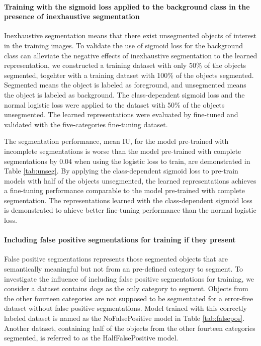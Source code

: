 \paragraph{Training with the sigmoid loss applied to the background class in the presence of inexhaustive segmentation}
Inexhaustive segmentation means that there exist unsegmented objects of interest in the training images.
To validate the use of sigmoid loss for the background class can alleviate the negative effects of inexhaustive segmentation to the learned representation, we constructed a training dataset with only 50\% of the objects segmented, togehter with a training dataset with 100\% of the objects segmented.
Segmented means the object is labeled as foreground, and unsegmented means the object is labeled as background.
The class-dependent sigmoid loss and the normal logistic loss were applied to the dataset with 50\% of the objects unsegmented.
The learned representations were evaluated by fine-tuned and validated with the five-categories fine-tuning dataset.

The segmentation performance, mean IU, for the model pre-trained with incomplete segmentations is worse than the model pre-trained with complete segmentations by 0.04 when using the logistic loss to train, are demonstrated in Table \ref{tab:unseg}.
By applying the class-dependent sigmoid loss to pre-train models with half of the objects unsegmented, the learned representations achieves a fine-tuning performance comparable to the model pre-trained with complete segmentation.
The representations learned with the class-dependent sigmoid loss is demonstrated to ahieve better fine-tuning performance than the normal logistic loss.



\paragraph{Including false positive segmentations for training if they present}
False positive segmentations represents those segmented objects that are semantically meaningful but not from an pre-defined category to segment.
To investigate the influence of including false positive segmentations for training, we consider a dataset contains dogs as the only category to segment.
Objects from the other fourteen categories are not supposed to be segmentated for a error-free dataset without false positive segmentations.
Model trained with this correctly labeled dataset is named as the NoFalsePositive model in Table \ref{tab:falsepos}.
Another dataset, containing half of the objects from the other fourteen categories segmented, is referred to as the HalfFalsePositive model.

